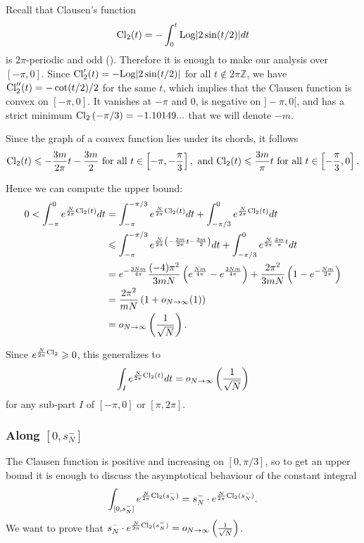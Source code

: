 \documentclass[11pt]{amsart}
\newcommand{\Z}{\mathbb{Z}}
\newcommand{\Log}{{\rm Log}}
\begin{document}
{Recall that Clausen's function
\begin{equation}\label{Clausenf} {\rm Cl}_2(t) = -\int_0^t \Log\vert 2\sin(t/2)\vert dt
\end{equation}
is $2\pi$-periodic and odd (\cite{Z}). Therefore it is enough to make our analysis over $[-\pi,0]$. Since ${\rm Cl}'_2(t)= -\Log\vert 2\sin(t/2)\vert$ for all $t \notin 2\pi \Z$, we have ${\rm Cl}''_2(t)= -\cot(t/2)/2$ for the same $t$, which implies that the Clausen function is convex on $[-\pi,0]$. It vanishes at $-\pi$ and $0$, is negative on $]-\pi,0[$, and has a strict minimum ${\rm Cl}_2\left (-\pi/3\right )= -1.10149...$ that we will denote $-m$.

Since the graph of a convex function lies under its chords, it follows
$${\rm Cl}_2(t)\leqslant -\dfrac{3 m}{2\pi}t-\dfrac{3m}{2}\ \text{for\ all}\ t \in \left [-\pi,-\frac{\pi}{3}\right ], \ \text{and}\ 
{\rm Cl}_2(t)\leqslant \dfrac{3 m}{\pi}t \ \text{for\ all}\ t \in \left [-\frac{\pi}{3},0\right ].$$

Hence we can compute the upper bound:
\begin{align*}
0 < \int_{-\pi}^0 e^{\frac{N}{2\pi} {\rm Cl}_2(t)}dt 
&= \int_{-\pi}^{-\pi/3} e^{\frac{N}{2\pi} {\rm Cl}_2(t)}dt 
+\int_{-\pi/3}^0 e^{\frac{N}{2\pi} {\rm Cl}_2(t)}dt \\
&\leqslant \int_{-\pi}^{-\pi/3} e^{\frac{N}{2\pi} \left (-\frac{3 m}{2\pi}t-\frac{3m}{2}\right )}dt 
+\int_{-\pi/3}^0 e^{\frac{N}{2\pi} \frac{3 m}{\pi}t}dt \\
&= 
e^{-\frac{3Nm}{4\pi}}
\frac{(-4)\pi^2}{3 m N}
\left (e^{\frac{Nm}{4\pi}}- e^{\frac{3Nm}{4\pi}}\right )
+ \frac{2\pi^2}{3 m N}\left (1- e^{-\frac{Nm}{2\pi}}\right )\\
&= \frac{2\pi^2}{ m N}\left (1+o_{N\to \infty}(1)\right )\\
&= o_{N\to \infty}\left (\frac{1}{\sqrt{N}}\right ).
\end{align*}

Since $e^{\frac{N}{2\pi} {\rm Cl}_2}\geqslant 0$, this generalizes to
$$\int_{I} e^{\frac{N}{2\pi} {\rm Cl}_2(t)}dt= o_{N\to \infty}\left (\frac{1}{\sqrt{N}}\right )$$
for any sub-part $I$ of $[-\pi,0]$ or $[\pi,2\pi]
$.

\subsubsection{Along $[0,s_N^-]$} \label{smallIsN} The Clausen function is positive and increasing on $[0,\pi/3]$, so to get an upper bound it is enough to discuss the asymptotical behaviour of the constant integral 
$$\int_{[0, s_N^-]} e^{\frac{N}{2\pi} {\rm Cl}_2(s_N^-)} = s_N^- \cdot e^{\frac{N}{2\pi} {\rm Cl}_2(s_N^-)}. $$ 
We want to prove that $s_N^- \cdot e^{\frac{N}{2\pi} {\rm Cl}_2(s_N^-)} = o_{N \to \infty}\left ( \frac{1}{\sqrt{N}}\right )$.

}
\end{document}
